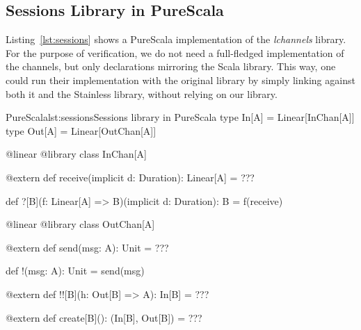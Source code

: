 \documentclass[a4paper,twoside]{article}
\newcommand{\RefCode}[1]{Listing~\ref{#1}}
\newcommand{\stt}[1]{\texttt{\small{#1}}}
\begin{document}
% 
%
%
%

\subsection{Sessions Library in PureScala}
\label{sessions_lib}

\RefCode{lst:sessions} shows a PureScala implementation of the \textit{lchannels} library. For the purpose of verification, we do not need a full-fledged implementation of the channels, but only declarations mirroring the Scala library. This way, one could run their implementation with the original library by simply linking against both it and the Stainless library, without relying on our library.

\begin{Code}{PureScala}{lst:sessions}{Sessions library in PureScala}
type In[A]  = Linear[InChan[A]]
type Out[A] = Linear[OutChan[A]]

@linear @library
class InChan[A] {

  @extern
  def receive(implicit d: Duration): Linear[A] = {
    ???
  }

  def ?[B](f: Linear[A] => B)(implicit d: Duration): B = {
    f(receive)
  }
}

@linear @library
class OutChan[A] {

  @extern
  def send(msg: A): Unit = {
    ???
  }

  def !(msg: A): Unit = {
    send(msg)
  }

  @extern
  def !![B](h: Out[B] => A): In[B] = {
    ???
  }

  @extern
  def create[B](): (In[B], Out[B]) = {
    ???
  }
}
\end{Code}
\end{document}
